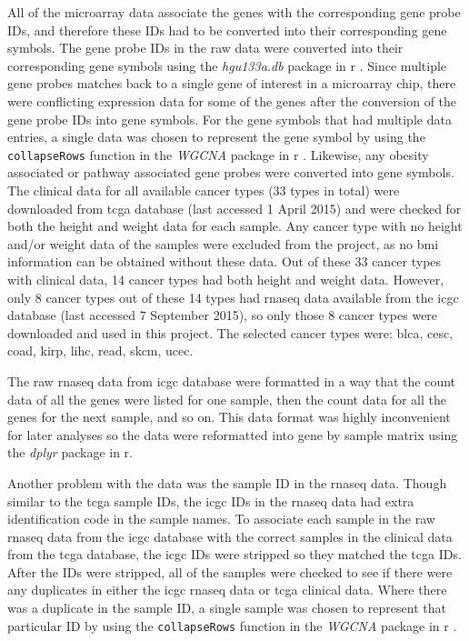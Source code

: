 All of the microarray data associate the genes with the corresponding gene probe IDs, and therefore these IDs had to be converted into their corresponding gene symbols.
The gene probe IDs in the raw data were converted into their corresponding gene symbols using the \textit{hgu133a.db} package in \gls{r} \citep{hgu133}.
Since multiple gene probes matches back to a single gene of interest in a microarray chip, there were conflicting expression data for some of the genes after the conversion of the gene probe IDs into gene symbols.
For the gene symbols that had multiple data entries, a single data was chosen to represent the gene symbol by using the \texttt{collapseRows} function in the \textit{WGCNA} package in \gls{r} \citep{Langfelder2008}.
Likewise, any obesity associated or pathway associated gene probes were converted into gene symbols.
\\


\noindent
The clinical data for all available cancer types (33 types in total) were downloaded from \gls{tcga} database (last accessed 1 April 2015) and were checked for both the height and weight data for each sample.
Any cancer type with no height and/or weight data of the samples were excluded from the project, as no \gls{bmi} information can be obtained without these data.
Out of these 33 cancer types with clinical data, 14 cancer types had both height and weight data.
However, only 8 cancer types out of these 14 types had \gls{rnaseq} data available from the \gls{icgc} database (last accessed 7 September 2015), so only those 8 cancer types were downloaded and used in this project.
The selected cancer types were: \gls{blca}, \gls{cesc}, \gls{coad}, \gls{kirp}, \gls{lihc}, \gls{read}, \gls{skcm}, \gls{ucec}.

The raw \gls{rnaseq} data from \gls{icgc} database were formatted in a way that the count data of all the genes were listed for one sample, then the count data for all the genes for the next sample, and so on.
This data format was highly inconvenient for later analyses so the data were reformatted into gene by sample matrix using the \textit{dplyr} package in \gls{r}.

Another problem with the data was the sample ID in the \gls{rnaseq} data.
Though similar to the \gls{tcga} sample IDs, the \gls{icgc} IDs in the \gls{rnaseq} data had extra identification code in the sample names.
To associate each sample in the raw \gls{rnaseq} data from the \gls{icgc} database with the correct samples in the clinical data from the \gls{tcga} database, the \gls{icgc} IDs were stripped so they matched the \gls{tcga} IDs.
After the IDs were stripped, all of the samples were checked to see if there were any duplicates in either the \gls{icgc} \gls{rnaseq} data or \gls{tcga} clinical data.
Where there was a duplicate in the sample ID, a single sample was chosen to represent that particular ID by using the \texttt{collapseRows} function in the \textit{WGCNA} package in \gls{r} \citep{Langfelder2008}.

